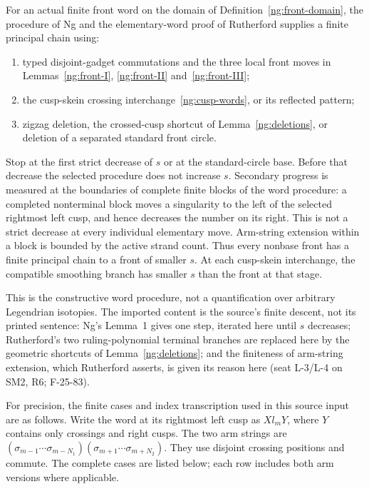 \begin{literature}\label{ng:finite-word}
For an actual finite front word on the domain of
Definition~\ref{ng:front-domain}, the procedure of Ng
\cite[pp.~6--8 and Figure~1]{Ng} and the elementary-word proof of
Rutherford \cite[Lemma~3.2, pp.~8--12 of the arXiv version]{Rutherford}
supplies a finite principal chain using:
\begin{enumerate}
\item typed disjoint-gadget commutations and the three local front moves
  in Lemmas~\ref{ng:front-I}, \ref{ng:front-II} and~\ref{ng:front-III};
\item the cusp-skein crossing interchange~\eqref{ng:cusp-words}, or its
  reflected pattern;
\item zigzag deletion, the crossed-cusp shortcut of
  Lemma~\ref{ng:deletions}, or deletion of a separated standard front
  circle.
\end{enumerate}
Stop at the first strict decrease of $s$ or at the standard-circle base.
Before that decrease the selected procedure does not increase $s$.
Secondary progress is measured at the boundaries of complete finite
blocks of the word procedure: a completed nonterminal block moves a
singularity to the left of the selected rightmost left cusp, and hence
decreases the number on its right. This is not a strict decrease at
every individual elementary move. Arm-string extension within a block
is bounded by the active strand count. Thus every nonbase front has a
finite principal chain to a front of smaller $s$. At each cusp-skein
interchange, the compatible smoothing branch has smaller $s$ than the
front at that stage.

This is the constructive word procedure, not a quantification over
arbitrary Legendrian isotopies. The imported content is the source's finite
descent, not its printed sentence: Ng's Lemma~1 gives one step, iterated
here until $s$ decreases; Rutherford's two ruling-polynomial terminal
branches are replaced here by the geometric shortcuts of
Lemma~\ref{ng:deletions}; and the finiteness of arm-string extension, which
Rutherford asserts, is given its reason here (seat L-3/L-4 on SM2, R6;
F-25-83).
\end{literature}

For precision, the finite cases and index transcription used in this
source input are as follows. Write the word at its rightmost left cusp
as $Xl_mY$, where $Y$ contains only crossings and right cusps. The two
arm strings are
$(\sigma_{m-1}\cdots\sigma_{m-N_1})
 (\sigma_{m+1}\cdots\sigma_{m+N_2})$.
They use disjoint crossing positions and commute. The complete cases
are listed below; each row includes both arm versions where applicable.


